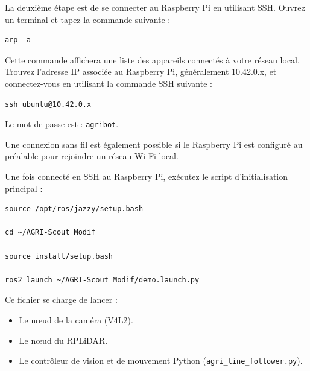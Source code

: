 \documentclass [12pt, a4paper]{article}
\begin{document}
La deuxième étape est de se connecter au Raspberry Pi en utilisant SSH. Ouvrez un terminal et tapez la commande suivante :
\begin{verbatim}
arp -a
\end{verbatim}
Cette commande affichera une liste des appareils connectés à votre réseau local. 
Trouvez l'adresse IP associée au Raspberry Pi, généralement 10.42.0.x, et connectez-vous en utilisant la commande SSH suivante :
\begin{verbatim}
ssh ubuntu@10.42.0.x
\end{verbatim}
Le mot de passe est : \texttt{agribot}.

Une connexion sans fil est également possible si le Raspberry Pi est configuré au préalable pour rejoindre un réseau Wi-Fi local.


Une fois connecté en SSH au Raspberry Pi, exécutez le script d'initialisation principal :
\begin{verbatim}
source /opt/ros/jazzy/setup.bash

cd ~/AGRI-Scout_Modif

source install/setup.bash

ros2 launch ~/AGRI-Scout_Modif/demo.launch.py
\end{verbatim}

Ce fichier se charge de lancer :
\begin{itemize}
    \item Le nœud de la caméra (V4L2).
    \item Le nœud du RPLiDAR.
    \item Le contrôleur de vision et de mouvement Python (\texttt{agri\_line\_follower.py}).
\end{itemize}
\end{document}
